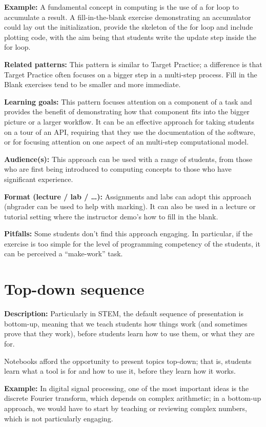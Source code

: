 \documentclass[]{book}
\begin{document}
\textbf{Example:} A fundamental concept in computing is the use of a for
loop to accumulate a result. A fill-in-the-blank exercise demonstrating
an accumulator could lay out the initialization, provide the skeleton of
the for loop and include plotting code, with the aim being that students
write the update step inside the for loop.

\textbf{Related patterns:} This pattern is similar to Target Practice; a
difference is that Target Practice often focuses on a bigger step in a
multi-step process. Fill in the Blank exercises tend to be smaller and
more immediate.

\textbf{Learning goals:} This pattern focuses attention on a component
of a task and provides the benefit of demonstrating how that component
fits into the bigger picture or a larger workflow. It can be an
effective approach for taking students on a tour of an API, requiring
that they use the documentation of the software, or for focusing
attention on one aspect of an multi-step computational model.

\textbf{Audience(s):} This approach can be used with a range of
students, from those who are first being introduced to computing
concepts to those who have significant experience.

\textbf{Format (lecture / lab / \ldots{}):} Assignments and labs can
adopt this approach (nbgrader can be used to help with marking). It can
also be used in a lecture or tutorial setting where the instructor
demo's how to fill in the blank.

\textbf{Pitfalls:} Some students don't find this approach engaging. In
particular, if the exercise is too simple for the level of programming
competency of the students, it can be perceived a ``make-work'' task.

\section{Top-down sequence}\label{top-down-sequence}

\textbf{Description:} Particularly in STEM, the default sequence of
presentation is bottom-up, meaning that we teach students how things
work (and sometimes prove that they work), before students learn how to
use them, or what they are for.

Notebooks afford the opportunity to present topics top-down; that is,
students learn what a tool is for and how to use it, before they learn
how it works.

\textbf{Example:} In digital signal processing, one of the most
important ideas is the discrete Fourier transform, which depends on
complex arithmetic; in a bottom-up approach, we would have to start by
teaching or reviewing complex numbers, which is not particularly
engaging.
\end{document}
